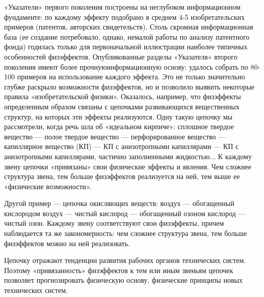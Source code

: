 «Указатели» первого  поколения построены на  неглубоком информационном
фундаменте:   по    каждому   эффекту   подобрано   в    среднем   4-5
изобретательских  примеров (патентов,  авторских свидетельств).  Столь
скромная  информационная   база  (ее  создание   потребовало,  однако,
немалой  работы  по  анализу  патентного фонда)  годилась  только  для
первоначальной иллюстрации наиболее типичных особенностей физэффектов.
Опубликованные  разделы  «Указателя»  второго  поколения  имеют  более
прочнуюинформационную основу:  удалось собрать  по 80-100  примеров на
использование  каждого  эффекта.  Это  не  только  значительно  глубже
раскрыло  возможности физэффектов,  но и  позволило выявить  некоторые
правила «изобретательской физики». Оказалось, например, что физэффекты
определенным  образом связаны  с цепочками  развивающихся вещественных
структур, на  которых эти эффекты  реализуются. Одну такую  цепочку мы
рассмотрели, когда  речь шла об «идеальном  кирпиче»: сплошное твердое
вещество  —  полое  твердое  вещество  —  перфорированное  вещество  —
капиллярное  вещество  (КП) —  КП  с  анизотропными капиллярами  —  КП
с  анизотропными  капиллярами,  частично заполненными  жидкостью...  К
каждому звену  цепочки «привязаны» свои физические  эффекты и явления.
Чем  сложнее структура  звена, тем  больше физэффектов  реализуется на
ней, тем выше ее «физические возможности».

Другой  пример  — цепочка  окисляющих  веществ:  воздух —  обогащенный
кислородом воздух  — чистый кислород  — обогащенный озоном  кислород —
чистый  озон.  Каждому  звену соответствуют  свои  физэффекты,  причем
наблюдается  та же  закономерность: чем  сложнее структура  звена, тем
больше физэффектов можно на ней реализовать.

Цепочку  отражают  тенденции   развития  рабочих  органов  технических
систем.  Поэтому «привязанность»  физэффектов к  тем или  иным звеньям
цепочек   позволяет  прогнозировать   физическую  основу,   физические
принципы новых технических систем.

